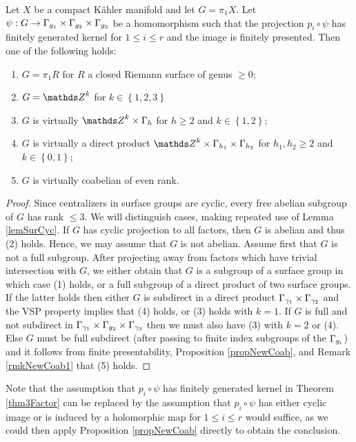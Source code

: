 \begin{theorem}
Let $X$ be a compact K\"ahler manifold and let $G=\pi_1 X$. Let $\psi: G \to  \Gamma_{g_1}\times \Gamma_{g_2}\times \Gamma_{g_3}$ be a homomorphism such that the projection $p_i \circ \psi$  has finitely generated kernel for $1\leq i \leq r$ and the image is finitely presented. Then one of the following holds:
 \begin{enumerate}
  \item $G=\pi_1 R$ for $R$ a closed Riemann surface of genus $\geq 0$;
  \item $G= \ZZ^k$ for $k\in \left\{1,2,3\right\}$
  \item $G$ is virtually $\ZZ^k \times \Gamma_h$ for $h\geq 2$ and $k\in \left\{1,2\right\}$;
  \item $G$ is virtually a direct product $\ZZ^k\times \Gamma_{h_1}\times \Gamma_{h_2}$ for $h_1, h_2\geq 2$ and $k\in \left\{0,1\right\}$;
  \item $G$ is virtually coabelian of even rank.
 \end{enumerate}
 \label{thm3Factor}
\end{theorem}
\begin{proof}
 Since centralizers in surface groups are cyclic, every free abelian subgroup of $G$ has rank $\leq 3$. We will distinguish cases, making repeated use of Lemma \ref{lemSurCyc}. If $G$ has cyclic projection to all factors, then $G$ is abelian and thus (2) holds. Hence, we may assume that $G$ is not abelian. Assume first that $G$ is not a full subgroup. After projecting away from factors which have trivial intersection with $G$, we either obtain that $G$ is a subgroup of a surface group in which case (1) holds, or a full subgroup of a direct product of two surface groups. If the latter holds then either $G$ is subdirect in a direct product $\Gamma_{\gamma_1}\times \Gamma_{\gamma_2}$ and the VSP property implies that (4) holds, or (3) holds with $k=1$. If $G$ is full and not subdirect in $\Gamma_{\gamma_1}\times \Gamma_{g_2}\times \Gamma_{\gamma_3}$ then we must also have (3) with $k=2$ or (4). Else $G$ must be full subdirect (after passing to finite index subgroups of the $\Gamma_{g_i}$) and it follows from finite presentability, Proposition \ref{propNewCoab}, and Remark \ref{rmkNewCoab1} that (5) holds.
\end{proof}

\begin{remark}
Note that the assumption that $p_i\circ \psi$ has finitely generated kernel in Theorem \ref{thm3Factor} can be replaced by the assumption that $p_i \circ \psi$ has either cyclic image or is induced by a holomorphic map for $1\leq i \leq r$ would suffice, as we could then apply Proposition \ref{propNewCoab} directly to obtain the conclusion. 
\end{remark}

